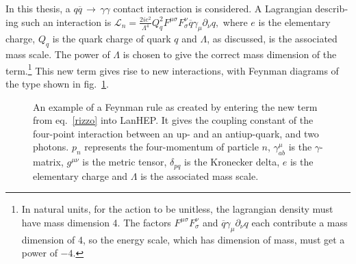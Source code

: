 \begin{english}
In this thesis, a $q\overline{q}\,\rightarrow\,\gamma\gamma$ contact interaction is considered. A Lagrangian describing such an interaction is \cite{rizzo}
\(\mathcal L_n = \frac{2ie^2}{\Lambda^4}Q_q^2F^{\mu\sigma}F^\nu_\sigma\overline{q}\gamma_\mu\partial_\nu q,\label{rizzo}\)
where $e$ is the elementary charge, $Q_q$ is the quark charge of quark $q$ and $\Lambda$, as discussed, is the associated mass scale. The power of $\Lambda$ is chosen to give the correct mass dimension of the term.\footnote{In natural units, for the action to be unitless, the lagrangian density must have mass dimension 4. The factors $F^{\mu\sigma}F^\nu_\sigma$ and $\overline{q}\gamma_\mu\partial_\nu q$ each contribute a mass dimension of 4, so the energy scale, which has dimension of mass, must get a power of $-4$.} This new term gives rise to new interactions, with Feynman diagrams of the type shown in fig.~\ref{rule}.

\begin{figure}[hbt]\begin{center}
{\footnotesize{}
}\end{center}
\caption{An example of a Feynman rule as created by entering the new term from eq.~\eqref{rizzo} into LanHEP\cite{lanhep}. It gives the coupling constant of the four-point interaction between an up- and an antiup-quark, and two photons. $p_n$ represents the four-momentum of particle $n$, $\gamma_{ab}^\mu$ is the $\gamma$-matrix, $g^{\mu\nu}$ is the metric tensor, $\delta_{pq}$ is the Kronecker delta, $e$ is the elementary charge and $\Lambda$ is the associated mass scale.\label{rule}}
\end{figure}


\end{english}
